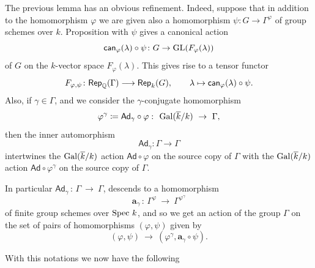 \documentclass[twoside,leqno]{article}
\numberwithin{equation}{section}
\theoremstyle{plain}
\theoremstyle{definition}
\begin{document}
The previous lemma has an obvious refinement. Indeed, suppose that in
addition to the  homomorphism $\varphi$
we are given also a  homomorphism $\psi \colon G \to
\Gamma^{\varphi}$ of group schemes over $k$.
Proposition with $\psi$ gives a canonical action
\[
\mathsf{can}_{\varphi}(\lambda)\circ \psi \colon G \to \operatorname{GL}(F_{\varphi}(\lambda))
\]
of $G$ on the $k$-vector space $F_{\varphi}(\lambda)$.
This gives rise to a tensor functor
\[
F_{\varphi,\psi} \colon \mathsf{Rep}_{\mathbb Q}(\Gamma) \longrightarrow
\mathsf{Rep}_{k}(G), \qquad \lambda \mapsto
\mathsf{can}_{\varphi}(\lambda)\circ \psi. 
\]
Also, if $\gamma \in \Gamma$, and we consider the $\gamma$-conjugate homomorphism
\[
\varphi^{\gamma} \coloneqq \mathsf{Ad}_{\gamma}\circ \varphi \, \colon \, \Gal(\kbar/k) \ \to \ \Gamma,
\]
then the inner automorphism 
\[
\mathsf{Ad}_{\gamma} \colon \Gamma \to \Gamma
\]
intertwines the $\operatorname{Gal}(\overline{k}/k)$ action $\mathsf{Ad}\circ \varphi$ on the source copy of $\Gamma$ with the $\operatorname{Gal}(\overline{k}/k)$ action $\mathsf{Ad}\circ \varphi^{\gamma}$ on the source copy of $\Gamma$.

In particular $\mathsf{Ad}_{\gamma} \, \colon \, \Gamma \ \to \ \Gamma$, descends to a homomorphism
\[
\mathbf{a}_{\gamma} \, \colon \,  \Gamma^{\varphi} \ \to \ \Gamma^{\varphi^{\gamma}}
\]
of finite group schemes over $\operatorname{Spec}\, k$, and so we get an action of the group $\Gamma$ on the set of pairs of homomorphisms $(\varphi,\psi)$ given by 
\begin{equation} \label{eq:Gammaacts}
(\varphi,\psi) \ \to \ \left(\varphi^{\gamma},\mathbf{a}_{\gamma}\circ\psi\right).
\end{equation}


With this notations we now have the following
\end{document}

